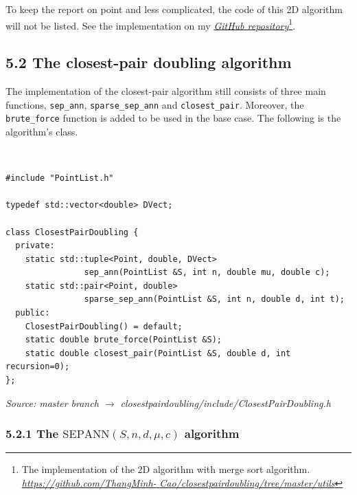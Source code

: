 \documentclass[12pt,english,]{article}
\newcommand{\code}[1]{\colorbox{light-gray}{\texttt{#1}}}
\newcommand{\pnt}[1]{{\scriptstyle#1}}
\begin{document}
To keep the report on point and less complicated, the code of this 2D
algorithm will not be listed. See the implementation on my
\href{https://github.com/ThangMinhCao/closestpairdoubling/tree/master/utils}{\emph{GitHub
repository}}\footnote{The implementation of the 2D algorithm with merge
  sort algorithm.
  \href{https://github.com/ThangMinhCao/closestpairdoubling/tree/master/utils}{\emph{https://github.com/ThangMinh-}
  \emph{Cao/closestpairdoubling/tree/master/utils}}}.

\hypertarget{section5.2}{%
\subsection{5.2 The closest-pair doubling algorithm}\label{section5.2}}

The implementation of the closest-pair algorithm still consists of three
main functions, \code{sep\_ann}, \code{sparse\_sep\_ann} and
\code{closest\_pair}. Moreover, the \code{brute\_force} function is
added to be used in the base case. The following is the algorithm's
class.

~

\begin{lstlisting}
#include "PointList.h"

typedef std::vector<double> DVect;

class ClosestPairDoubling {
  private:
    static std::tuple<Point, double, DVect>
                sep_ann(PointList &S, int n, double mu, double c);
    static std::pair<Point, double>
                sparse_sep_ann(PointList &S, int n, double d, int t);
  public:
    ClosestPairDoubling() = default;
    static double brute_force(PointList &S);
    static double closest_pair(PointList &S, double d, int recursion=0);
};
\end{lstlisting}
\vspace{-9truemm}
\begin{minipage}{1\textwidth}
  \begin{flushright}
  {\footnotesize \emph{Source: master branch $\rightarrow$ closestpairdoubling/include/ClosestPairDoubling.h}\par}
  \end{flushright}
\end{minipage}

\hypertarget{section5.2.1}{%
\subsubsection{\texorpdfstring{5.2.1 The
\(\mathrm{S\pnt{EP}A\pnt{NN}}(S,n,d,\mu,c)\)
algorithm}{5.2.1 The \textbackslash{}mathrm\{S\textbackslash{}pnt\{EP\}A\textbackslash{}pnt\{NN\}\}(S,n,d,\textbackslash{}mu,c) algorithm}}\label{section5.2.1}}
\end{document}
